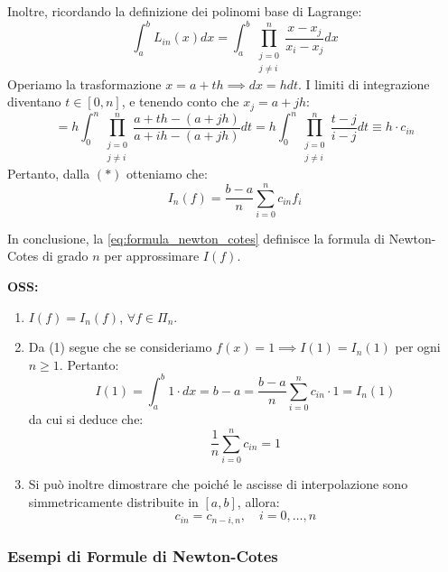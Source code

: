 Inoltre, ricordando la definizione dei polinomi base di Lagrange:
\begin{equation*}
\int_{a}^{b} L_{in}(x) dx = \int_{a}^{b} \prod_{\substack{j=0 \\ j \neq i}}^{n} \frac{x - x_j}{x_i - x_j} dx
\end{equation*}
Operiamo la trasformazione $x = a + th \implies dx = h dt$. I limiti di integrazione diventano $t \in [0, n]$, e tenendo conto che $x_j = a + jh$:
\begin{equation*}
= h \int_{0}^{n} \prod_{\substack{j=0 \\ j \neq i}}^{n} \frac{a + th - (a + jh)}{a + ih - (a + jh)} dt = h \int_{0}^{n} \prod_{\substack{j=0 \\ j \neq i}}^{n} \frac{t - j}{i - j} dt \equiv h \cdot c_{in}
\end{equation*}
Pertanto, dalla $(*)$ otteniamo che:
\begin{equation} \label{eq:formula_newton_cotes}
I_n(f) = \frac{b-a}{n} \sum_{i=0}^{n} c_{in} f_i
\end{equation}

In conclusione, la \eqref{eq:formula_newton_cotes} definisce la formula di Newton-Cotes di grado $n$ per approssimare $I(f)$.

\textbf{OSS:}
\begin{enumerate}
    \item $I(f) = I_n(f)$, $\forall f \in \Pi_n$. 
    
    \item Da (1) segue che se consideriamo $f(x)=1 \implies I(1) = I_n(1)$ per ogni $n \ge 1$. Pertanto:
    $$ I(1) = \int_{a}^{b} 1 \cdot dx = b-a = \frac{b-a}{n} \sum_{i=0}^{n} c_{in} \cdot 1 = I_n(1) $$
    da cui si deduce che:
    \begin{equation} \label{eq:somma_pesi_NC}
    \frac{1}{n} \sum_{i=0}^{n} c_{in} = 1
    \end{equation}
    
    \item Si può inoltre dimostrare che poiché le ascisse di interpolazione sono simmetricamente distribuite in $[a,b]$, allora:
    \begin{equation} \label{eq:simmetria_pesi_NC}
    c_{in} = c_{n-i, n}, \quad i=0, \dots, n
    \end{equation}
\end{enumerate}

\vspace{0.5cm}
\subsubsection{Esempi di Formule di Newton-Cotes}

